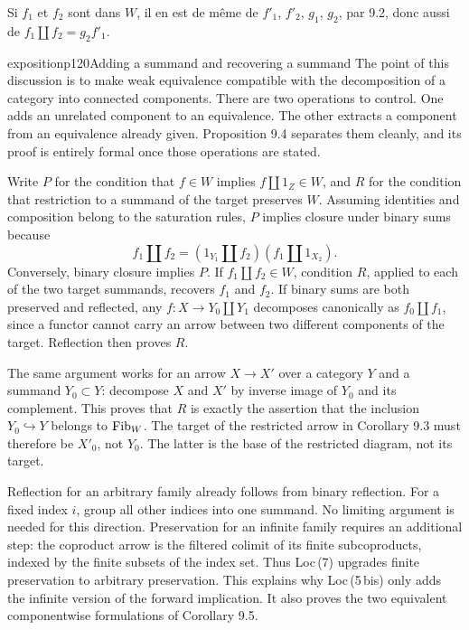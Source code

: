 
Si $f_1$ et $f_2$ sont dans $W$, il en est de même de $f'_1$, $f'_2$, $g_1$, $g_2$, par 9.2, donc aussi de $f_1\amalg f_2=g_2f'_1$.


\begin{dcomment}{exposition}{p120}{Adding a summand and recovering a summand}
The point of this discussion is to make weak equivalence compatible with the decomposition of a category into connected components. There are two operations to control. One adds an unrelated component to an equivalence. The other extracts a component from an equivalence already given. Proposition 9.4 separates them cleanly, and its proof is entirely formal once those operations are stated.

Write $P$ for the condition that $f\in W$ implies $f\amalg1_Z\in W$, and $R$ for the condition that restriction to a summand of the target preserves $W$. Assuming identities and composition belong to the saturation rules, $P$ implies closure under binary sums because
\[
 f_1\amalg f_2=(1_{Y_1}\amalg f_2)(f_1\amalg1_{X_2}).
\]
Conversely, binary closure implies $P$. If $f_1\amalg f_2\in W$, condition $R$, applied to each of the two target summands, recovers $f_1$ and $f_2$. If binary sums are both preserved and reflected, any $f:X\longrightarrow Y_0\amalg Y_1$ decomposes canonically as $f_0\amalg f_1$, since a functor cannot carry an arrow between two different components of the target. Reflection then proves $R$.

The same argument works for an arrow $X\longrightarrow X'$ over a category $Y$ and a summand $Y_0\subset Y$: decompose $X$ and $X'$ by inverse image of $Y_0$ and its complement. This proves that $R$ is exactly the assertion that the inclusion $Y_0\hookrightarrow Y$ belongs to $\mathrm{Fib}_W$. The target of the restricted arrow in Corollary 9.3 must therefore be $X'_0$, not $Y_0$. The latter is the base of the restricted diagram, not its target.

Reflection for an arbitrary family already follows from binary reflection. For a fixed index $i$, group all other indices into one summand. No limiting argument is needed for this direction. Preservation for an infinite family requires an additional step: the coproduct arrow is the filtered colimit of its finite subcoproducts, indexed by the finite subsets of the index set. Thus Loc\,(7) upgrades finite preservation to arbitrary preservation. This explains why Loc\,(5\,bis) only adds the infinite version of the forward implication. It also proves the two equivalent componentwise formulations of Corollary 9.5.


\end{dcomment}
